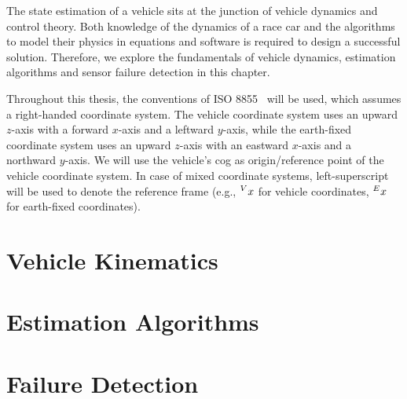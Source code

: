 The state estimation of a vehicle sits at the junction of vehicle dynamics and control theory. Both knowledge of the dynamics of a race car and the algorithms to model their physics in equations and software is required to design a successful solution. Therefore, we explore the fundamentals of vehicle dynamics, estimation algorithms and sensor failure detection in this chapter.

Throughout this thesis, the conventions of ISO 8855~\cite{ISO.2011} will be used, which assumes a right-handed coordinate system. The vehicle coordinate system uses an upward $z$-axis with a forward $x$-axis and a leftward $y$-axis, while the earth-fixed coordinate system uses an upward $z$-axis with an eastward $x$-axis and a northward $y$-axis. We will use the vehicle's \gls{cog} as origin/reference point of the vehicle coordinate system. In case of mixed coordinate systems, left-superscript will be used to denote the reference frame (e.g., $\prescript{V}{}{x}$ for vehicle coordinates, $\prescript{E}{}{x}$ for earth-fixed coordinates).

\section{Vehicle Kinematics}


\section{Estimation Algorithms}


\section{Failure Detection}

